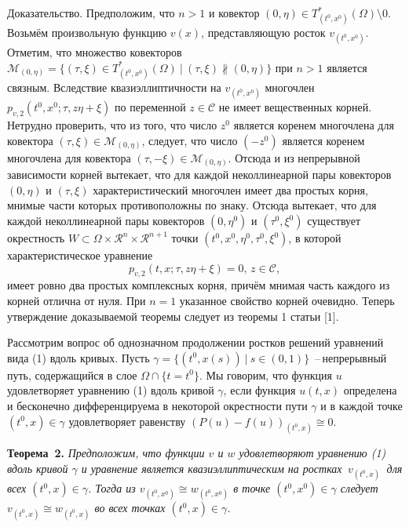 Доказательство. Предположим, что $n>1$ и ковектор $(0,\eta)\in T^{\ast}_{(t^0,x^0)}(\Omega)\setminus 0$. Возьмём произвольную функцию $v(x)$,  представляющую росток $v_{(t^0,x^0)}$. Отметим, что
множество ковекторов
${\mathcal M}_{(0,\eta)}=\{(\tau,\xi)\in T^{\ast}_{(t^0,x^0)}(\Omega)~|~
(\tau,\xi) \not\parallel (0,\eta)\}$ при $n>1$ является связным. Вследствие квазиэллиптичности на $v_{(t^0,x^0)}$
 многочлен $p_{v,2}(t^0,x^0;\tau,z\eta+\xi)$ по переменной $z\in {\mathcal C}$ не имеет вещественных корней. Нетрудно проверить, что из того, что
число $z^0$ является коренем многочлена для ковектора $(\tau,\xi)\in {\mathcal M}_{(0,\eta)}$, следует, что число $(-z^0)$ является коренем многочлена для ковектора $(\tau,-\xi)\in {\mathcal M}_{(0,\eta)}$. Отсюда и из непрерывной зависимости корней вытекает, что для каждой неколлинеарной пары ковекторов
$(0,\eta)$ и $(\tau,\xi)$ характеристический многочлен имеет два простых корня, мнимые части которых противоположны по знаку. Отсюда вытекает, что для каждой неколлинеарной пары ковекторов $(0,\eta^0)$ и $(\tau^0,\xi^0)$ существует окрестность $W\subset \Omega\times{\mathcal R}^n\times{\mathcal R}^{n+1}$ точки $(t^0,x^0,\eta^0,\tau^0,\xi^0)$, в которой характеристическое уравнение
$$
p_{v,2}(t,x;\tau,z\eta+\xi)=0,\,z\in{\mathcal C},
$$
имеет ровно два простых комплексных корня, причём мнимая часть каждого из корней отлична от нуля. При $n=1$ указанное свойство корней очевидно. Теперь утверждение доказываемой теоремы следует из теоремы 1 статьи [1].

Рассмотрим вопрос об однозначном продолжении ростков решений уравнений вида (1) вдоль кривых.
Пусть $\gamma=\{(t^0,x(s))~|~s\in(0,1)\}$ \,--\,непрерывный путь, содержащийся в слое $\Omega\cap\{t=t^0\}$. Мы говорим, что функция $u$ удовлетворяет уравнению (1) вдоль кривой $\gamma$, если функция $u(t,x)$ определена и бесконечно дифференцируема в некоторой окрестности пути $\gamma$ и в каждой точке $(t^0,x)\in\gamma$ удовлетворяет равенству $(P(u)-f(u))_{(t^0,x)}\cong 0$. 

\textbf{Теорема~2.} {\it
Предположим, что функции $v$ и $w$ удов\-летворяют уравнению {\rm (1)} вдоль кривой $\gamma$ и уравнение
яв\-ляется квазиэллиптическим на ростках \,$v_{(t^0,x)}$\, для всех
\linebreak
$(t^0,x)\in\gamma$.
Тогда из $v_{(t^0,x^0)}\cong w_{(t^0,x^0)}$ в точке $(t^0,x^0)\in\gamma$ следует $v_{(t^0,x)}\cong w_{(t^0,x)}$ во всех точках $(t^0,x)\in\gamma$.
}

